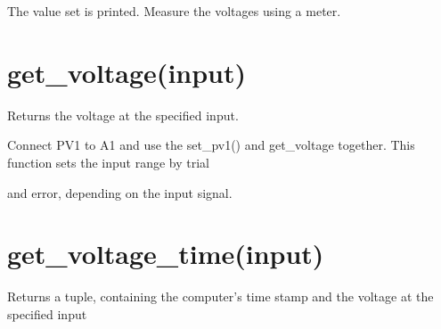 \documentclass[a4paper,12pt,english]{sphinxmanual}
\begin{document}
\begin{sphinxVerbatim}[commandchars=\\\{\}]
 
 
\end{sphinxVerbatim}

The value set is printed. Measure the voltages using a meter.


\section{get\_voltage(input)}
\label{\detokenize{7.1:get-voltage-input}}
Returns the voltage at the specified input.

\begin{sphinxVerbatim}[commandchars=\\\{\}]
 
 
 
 
 
\end{sphinxVerbatim}

Connect PV1 to A1 and use the set\_pv1() and get\_voltage together. This
function sets the input range by trial

and error, depending on the input signal.


\section{get\_voltage\_time(input)}
\label{\detokenize{7.1:get-voltage-time-input}}
Returns a tuple, containing the computer’s time stamp and the voltage at
the specified input

\begin{sphinxVerbatim}[commandchars=\\\{\}]
 
\end{sphinxVerbatim}
\end{document}
